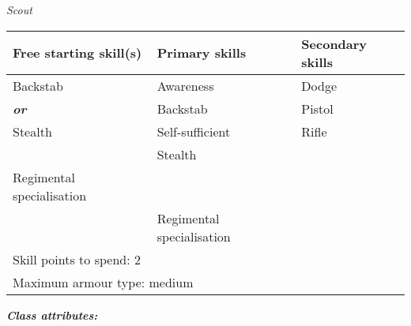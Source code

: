 \textit{Scout}

\begin{table}[H]
\begin{tabular}{|l|l|l|} \hline 
Free starting skill(s) & Primary skills & Secondary skills \\
 \hline Backstab & Awareness & Dodge \\
 \hline \textbf{\textit{or}} & Backstab & Pistol \\
 \hline Stealth & Self-sufficient & Rifle \\
 \hline  & Stealth &  \\
 \hline Regimental specialisation &  &  \\
 \hline  & Regimental specialisation &  \\
 \hline \multicolumn{3}{|l|}{Skill points to spend: 2} \\
 \hline \multicolumn{3}{|l|}{Maximum armour type: medium} \\
 \hline \end{tabular}

\end{table}

\textbf{\textit{Class attributes:}}

